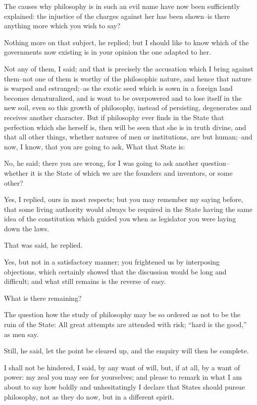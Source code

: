 The causes why philosophy is in such an evil name have now been
sufficiently explained: the injustice of the charges against her has
been shown--is there anything more which you wish to say?

Nothing more on that subject, he replied; but I should like to know
which of the governments now existing is in your opinion the one adapted
to her.

Not any of them, I said; and that is precisely the accusation which I
bring against them--not one of them is worthy of the philosophic nature,
and hence that nature is warped and estranged;--as the exotic seed
which is sown in a foreign land becomes denaturalized, and is wont to be
overpowered and to lose itself in the new soil, even so this growth
of philosophy, instead of persisting, degenerates and receives another
character. But if philosophy ever finds in the State that perfection
which she herself is, then will be seen that she is in truth divine, and
that all other things, whether natures of men or institutions, are but
human;--and now, I know, that you are going to ask, What that State is:

No, he said; there you are wrong, for I was going to ask another
question--whether it is the State of which we are the founders and
inventors, or some other?

Yes, I replied, ours in most respects; but you may remember my saying
before, that some living authority would always be required in the
State having the same idea of the constitution which guided you when as
legislator you were laying down the laws.

That was said, he replied.

Yes, but not in a satisfactory manner; you frightened us by interposing
objections, which certainly showed that the discussion would be long and
difficult; and what still remains is the reverse of easy.

What is there remaining?

The question how the study of philosophy may be so ordered as not to be
the ruin of the State: All great attempts are attended with risk; ``hard
is the good,'' as men say.

Still, he said, let the point be cleared up, and the enquiry will then
be complete.

I shall not be hindered, I said, by any want of will, but, if at all,
by a want of power: my zeal you may see for yourselves; and please to
remark in what I am about to say how boldly and unhesitatingly I declare
that States should pursue philosophy, not as they do now, but in a
different spirit.


